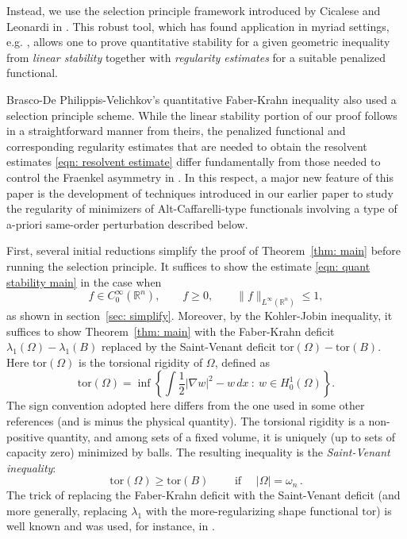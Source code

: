 \documentclass[10pt, reqno]{amsart}
\numberwithin{equation}{section}
\def\R{{\mathbb R}}
\def\W{\Omega}
\def\grad{\nabla}
\def\tor{\mathrm{tor}}
\begin{document}
Instead, we use the selection principle framework introduced by Cicalese and Leonardi in \cite{CiLe12}. This robust tool, which has found application in myriad settings, e.g. \cite{FuJu, BDF, BDS15, N16, DPMMCapacity, Mukoseeva+2021, FuscoZhang}, allows one to prove quantitative stability for a given geometric inequality from {\it linear stability} together with {\it regularity estimates} for a suitable penalized functional. 


Brasco-De Philippis-Velichkov's quantitative Faber-Krahn inequality \cite{BDV15} also used a selection principle scheme. While the linear stability portion of our proof follows in a straightforward manner from theirs, the penalized functional and corresponding regularity estimates that are needed to obtain the resolvent estimates \eqref{eqn: resolvent estimate}  differ fundamentally  from those needed to control the Fraenkel asymmetry in \cite{BDV15}. 
In this respect, a major new feature of this paper is the development of techniques introduced in our earlier paper \cite{AKN2} to study the regularity of minimizers of Alt-Caffarelli-type functionals involving a type of a-priori same-order perturbation described below.

First, several initial reductions simplify the proof of Theorem~\ref{thm: main} before running the selection principle. It suffices to show the estimate \eqref{eqn: quant stability main} in the case when
 \begin{equation}\label{eqn: f hyp after reductions}
     f \in C_0^\infty(\R^n), \qquad f\geq 0 , \qquad \|f\|_{L^{\infty}(\R^n)}\leq 1,
 \end{equation}
 as shown in section~\ref{sec: simplify}. Moreover, by the Kohler-Jobin inequality, it suffices to show Theorem~\ref{thm: main} with  the Faber-Krahn deficit $\lambda_1(\W) -\lambda_1(B)$ replaced by the Saint-Venant deficit $\tor(\W)-\tor(B)$. Here $\tor(\W)$ is
the torsional rigidity of $\W$,  defined as
	\begin{equation}\label{e: torsion def}
 \tor(\W) =\inf  \left\{ \int \frac{1}{2} |\grad w|^2 - w \, dx \ : \ w \in H^1_0(\W)\right\}.
	\end{equation}
The sign convention adopted here differs from the one used in some other references (and is minus the physical quantity). The torsional rigidity is  a non-positive quantity, and among sets of a fixed volume, it is uniquely (up to sets of capacity zero) minimized by balls. The resulting inequality is the {\it  Saint-Venant inequality}:
	\begin{equation}\label{e: saint venant}
    \tor(\W)\geq \tor(B) \qquad \text{ if } \quad|\W| = \omega_n\,.
    \end{equation}
The trick of replacing the Faber-Krahn deficit with the Saint-Venant deficit (and more generally, replacing $\lambda_1$ with the more-regularizing shape functional $\tor$) is well known and was used, for instance, in \cite{BDV15, blnp23}.
\end{document}
